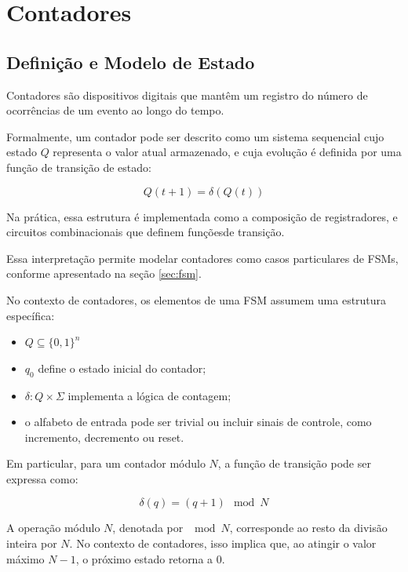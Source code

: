 \section{Contadores}

\subsection{Definição e Modelo de Estado}

Contadores são dispositivos digitais que mantêm um registro do número de ocorrências de um evento ao longo do tempo.

Formalmente, um contador pode ser descrito como um sistema sequencial cujo estado $Q$ representa o valor atual armazenado, e cuja evolução é definida por uma função de transição de estado:

\[
Q(t+1) = \delta(Q(t))
\]

Na prática, essa estrutura é implementada como a composição de registradores, e circuitos combinacionais que definem funçõesde transição.

Essa interpretação permite modelar contadores como casos particulares de FSMs, conforme apresentado na seção \ref{sec:fsm}.

No contexto de contadores, os elementos de uma FSM assumem uma estrutura específica:

\begin{itemize}
    \item $Q \subseteq \{0,1\}^n$
    \item $q_0$ define o estado inicial do contador;
    \item $\delta: Q \times \Sigma$ implementa a lógica de contagem;
    \item o alfabeto de entrada pode ser trivial ou incluir sinais de controle, como incremento, decremento ou reset.
\end{itemize}

Em particular, para um contador módulo $N$, a função de transição pode ser expressa como:

\[
\delta(q) = (q + 1) \mod N
\]

A operação módulo $N$, denotada por $\mod N$, corresponde ao resto da divisão inteira por $N$. 
No contexto de contadores, isso implica que, ao atingir o valor máximo $N-1$, o próximo estado retorna a $0$.



